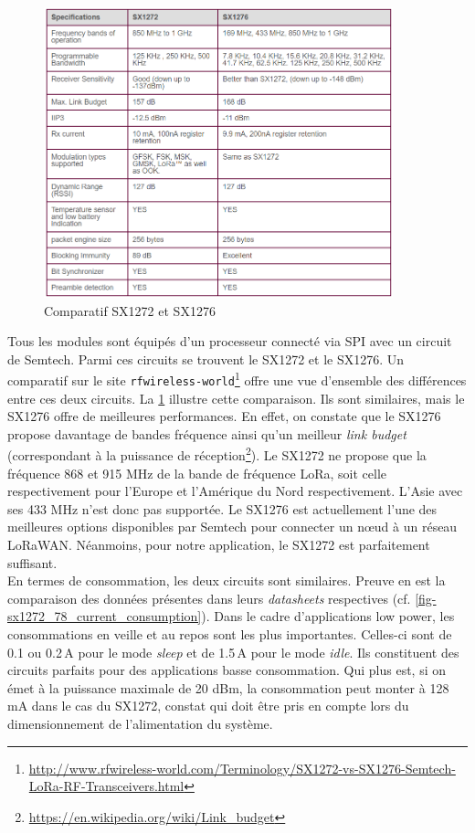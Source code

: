 \begin{figure}[ht!]
    \centering
    \includegraphics[width=0.9\textwidth]{Figures/Hardware/sx1272_vs_sx1276.PNG}
    \caption{Comparatif SX1272 et SX1276}
    \label{fig-sx1272_vs_sx1276}
\end{figure}

Tous les modules sont équipés d'un processeur connecté via SPI avec un circuit de Semtech. Parmi ces circuits se trouvent le SX1272 et le SX1276. Un comparatif sur le site \texttt{rfwireless-world}\footnote{\url{http://www.rfwireless-world.com/Terminology/SX1272-vs-SX1276-Semtech-LoRa-RF-Transceivers.html}} offre une vue d'ensemble des différences entre ces deux circuits. La \cref{fig-sx1272_vs_sx1276} illustre cette comparaison. Ils sont similaires, mais le SX1276 offre de meilleures performances. En effet, on constate que le SX1276 propose davantage de bandes fréquence ainsi qu'un meilleur \textit{link budget} (correspondant à la puissance de réception\footnote{\url{https://en.wikipedia.org/wiki/Link_budget}}). Le SX1272 ne propose que la fréquence 868 et 915 MHz de la bande de fréquence LoRa, soit celle respectivement pour l'Europe et l'Amérique du Nord respectivement. L'Asie avec ses 433 MHz n'est donc pas supportée. Le SX1276 est actuellement l'une des meilleures options disponibles par Semtech pour connecter un n\oe ud à un réseau LoRaWAN. Néanmoins, pour notre application, le SX1272 est parfaitement suffisant.\\

En termes de consommation, les deux circuits sont similaires. Preuve en est la comparaison des données présentes dans leurs \textit{datasheets} respectives (cf. \cref{fig-sx1272_78_current_consumption}). Dans le cadre d'applications low power, les consommations en veille et au repos sont les plus importantes. Celles-ci sont de 0.1 ou 0.2\,\si{\micro}A pour le mode \textit{sleep} et de 1.5\,\si{\micro}A pour le mode \textit{idle}. Ils constituent des circuits parfaits pour des applications basse consommation. Qui plus est, si on émet à la puissance maximale de 20 dBm, la consommation peut monter à 128 mA dans le cas du SX1272, constat qui doit être pris en compte lors du dimensionnement de l'alimentation du système.

